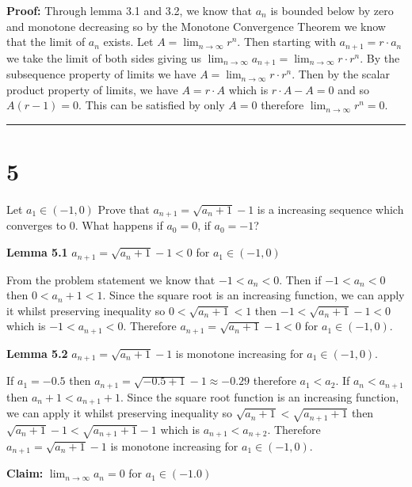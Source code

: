 \documentclass[10pt,letterpaper]{article}
\newcommand\ds{\displaystyle}
\newcommand\qedsym{\hfill \rule{2mm}{2mm}}
\begin{document}
\textbf{Proof:} Through lemma 3.1 and 3.2, we know that $a_n$ is bounded below by zero and monotone decreasing so by the Monotone Convergence Theorem we know that the limit of $a_n$ exists. Let $A = \ds \lim_{n \to \infty} r^n$. Then starting with $a_{n+1} = r\cdot a_n$ we take the limit of both sides giving us $\ds \lim_{n \to \infty} a_{n+1} = \ds \lim_{n\to\infty} r \cdot r^n$. By the subsequence property of limits we have $A = \ds \lim_{n\to\infty} r \cdot r^n$. Then by the scalar product property of limits, we have $A = r\cdot A$ which is $r\cdot A - A = 0$ and so $A (r - 1) = 0$. This can be satisfied by only $A = 0$ therefore $\ds \lim_{n \to \infty} r^n= 0$. \qedsym{

  \section*{5} Let $a_1 \in (-1, 0)$ Prove that $a_{n+1} = \sqrt{a_{n} +1} - 1$ is a increasing sequence which converges to 0. What happens if $a_0 = 0$, if $a_0 = -1$?

\medskip

\textbf{Lemma 5.1} $a_{n+1} = \sqrt{a_{n} +1} - 1 < 0$ for $a_1 \in (-1, 0)$

From the problem statement we know that $-1 < a_n < 0$. Then if $-1 < a_n < 0$ then $0 < a_n + 1 < 1$. Since the square root is an increasing function, we can apply it whilst preserving inequality so $0 < \sqrt{a_n + 1} < 1$ then $-1 < \sqrt{a_n + 1} - 1< 0$ which is $-1 < a_{n+1} < 0$. Therefore $a_{n+1} = \sqrt{a_{n} +1} - 1 < 0$ for $a_1 \in (-1, 0)$.

\medskip

\textbf{Lemma 5.2} $a_{n+1} = \sqrt{a_{n} +1} - 1$ is monotone increasing for $a_1 \in (-1, 0)$.

If $a_1 = -0.5$ then $a_{n+1} = \sqrt{-0.5 + 1} - 1 \approx -0.29$ therefore $a_1 < a_2$. If $a_n < a_{n+1}$ then $a_n + 1 < a_{n+1} + 1$. Since the square root function is an increasing function, we can apply it whilst preserving inequality so $\sqrt{a_n + 1} < \sqrt{a_{n+1} + 1}$ then $\sqrt{a_n + 1} - 1 < \sqrt{a_{n+1} + 1} - 1$ which is $a_{n+1} < a_{n+2}$. Therefore $a_{n+1} = \sqrt{a_{n} +1} - 1$ is monotone increasing for $a_1 \in (-1, 0)$.

\medskip

\textbf{Claim:} $\ds\lim_{n\to\infty} a_{n} = 0$ for $a_1 \in (-1. 0)$

\medskip

}
\end{document}
